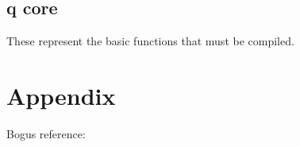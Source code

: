 \subsection{q core}
\label{q_core}

These represent the basic functions that must be compiled.

\section{Appendix}

Bogus reference: \cite{sarawagi99}

 




